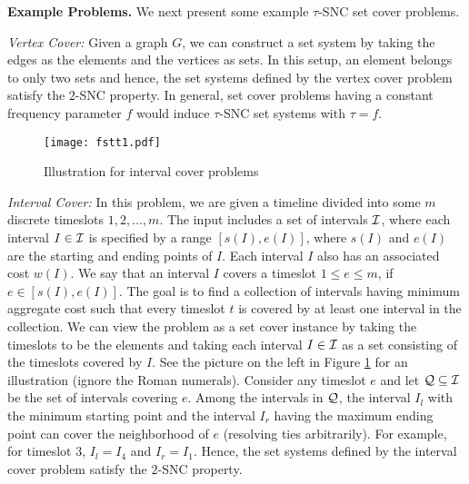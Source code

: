 \documentclass[11pt]{article}
\newcommand{\calQ} {{\cal Q}}
\newcommand{\calI} {{\cal I}}
\begin{document}
{\bf Example Problems.}
We next present some example $\tau$-SNC set cover problems.

{\em Vertex Cover: }Given a graph $G$, we can construct a set system
by taking the edges as the elements and the vertices as sets.
In this setup, an element belongs to only two sets and hence, the set systems defined by the
vertex cover problem satisfy the $2$-SNC property.
In general, set cover problems having a constant frequency parameter $f$ would induce
$\tau$-SNC set systems with $\tau=f$.

\begin{figure}
\begin{center}
\texttt{[image: fstt1.pdf]}
\caption{Illustration for interval cover problems}
\label{fig:interval}
\end{center}
\end{figure}


{\em Interval Cover: }
In this problem, we are given a timeline divided into some $m$ discrete timeslots
$1,2,\ldots,m$. The input includes a set of intervals $\calI$, where each interval $I\in \calI$
is specified by a range $[s(I),e(I)]$, where $s(I)$ and $e(I)$ are the starting and ending points of $I$.
Each interval $I$ also has an associated cost $w(I)$. We say that an interval $I$ covers a timeslot
$1\leq e\leq m$, if $e\in [s(I),e(I)]$. The goal is to find a collection of intervals
having minimum aggregate cost such that every timeslot $t$ is covered by at least one interval in the collection.
We can view the problem as a set cover instance by taking the timeslots to be the elements and
taking each interval $I\in \calI$ as a set consisting of the timeslots covered by $I$. 
See the picture on the left in Figure \ref{fig:interval} for an illustration (ignore the Roman numerals).
Consider any timeslot $e$ and let $\calQ\subseteq \calI$ be the set of intervals covering $e$.
Among the intervals in $\calQ$, the interval $I_l$ with the minimum starting point
and the interval $I_r$ having the maximum ending point can cover the neighborhood of $e$ (resolving ties arbitrarily).
For example, for timeslot $3$, $I_l = I_4$ and $I_r = I_1$.
Hence, the set systems defined by the interval cover problem satisfy the $2$-SNC property.
\end{document}
